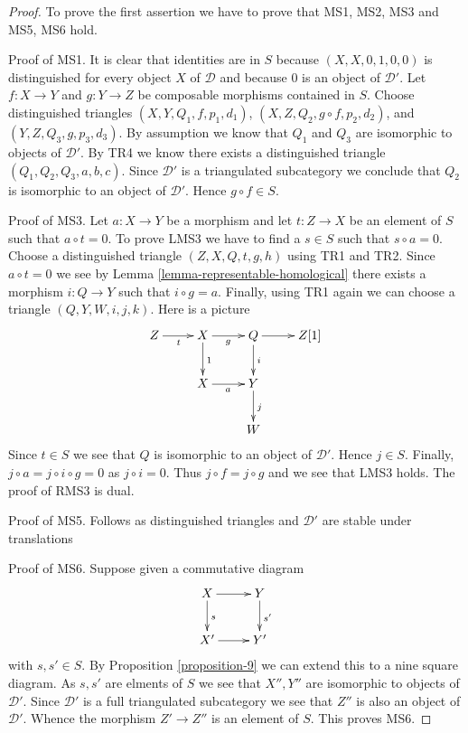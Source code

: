 \begin{proof}
To prove the first assertion we have to prove that
MS1, MS2, MS3 and MS5, MS6 hold.

\medskip\noindent
Proof of MS1. It is clear that identities are in $S$ because
$(X, X, 0, 1, 0, 0)$ is distinguished for every object $X$ of $\mathcal{D}$
and because $0$ is an object of $\mathcal{D}'$. Let $f : X \to Y$
and $g : Y \to Z$ be composable morphisms contained in $S$.
Choose distinguished triangles $(X, Y, Q_1, f, p_1, d_1)$,
$(X, Z, Q_2, g \circ f, p_2, d_2)$, and $(Y, Z, Q_3, g, p_3, d_3)$.
By assumption we know that $Q_1$ and $Q_3$ are isomorphic to objects
of $\mathcal{D}'$. By TR4 we know there exists a distinguished
triangle $(Q_1, Q_2, Q_3, a, b, c)$. Since $\mathcal{D}'$ is a
triangulated subcategory we conclude that $Q_2$ is isomorphic to
an object of $\mathcal{D}'$. Hence $g \circ f \in S$.

\medskip\noindent
Proof of MS3. Let $a : X \to Y$ be a morphism and let $t : Z \to X$ be
an element of $S$ such that $a \circ t = 0$. To prove LMS3 we have to
find a $s \in S$ such that $s \circ a = 0$. Choose a distinguished
triangle $(Z, X, Q, t, g, h)$ using TR1 and TR2. Since $a \circ t = 0$
we see by
Lemma \ref{lemma-representable-homological}
there exists a morphism $i : Q \to Y$ such that $i \circ g = a$.
Finally, using TR1 again we can choose a triangle
$(Q, Y, W, i, j, k)$. Here is a picture
$$
\xymatrix{
Z \ar[r]_t & X \ar[r]_g \ar[d]^1 & Q \ar[r] \ar[d]^i & Z[1] \\
& X \ar[r]_a & Y \ar[d]^j \\
& & W
}
$$
Since $t \in S$ we see that $Q$ is isomorphic to an object of $\mathcal{D}'$.
Hence $j \in S$. Finally, $j \circ a = j \circ i \circ g = 0$ as
$j \circ i = 0$. Thus $j \circ f = j \circ g$ and we see that LMS3 holds.
The proof of RMS3 is dual.

\medskip\noindent
Proof of MS5. Follows as distinguished triangles and $\mathcal{D}'$
are stable under translations

\medskip\noindent
Proof of MS6. Suppose given a commutative diagram
$$
\xymatrix{
X \ar[r] \ar[d]^s &
Y \ar[d]^{s'} \\
X' \ar[r] &
Y'
}
$$
with $s, s' \in S$. By
Proposition \ref{proposition-9}
we can extend this to a nine square diagram. As $s, s'$ are elments of $S$
we see that $X'', Y''$ are isomorphic to objects of $\mathcal{D}'$.
Since $\mathcal{D}'$ is a full triangulated subcategory we see that
$Z''$ is also an object of $\mathcal{D}'$. Whence the morphism $Z' \to Z''$
is an element of $S$. This proves MS6.


\end{proof}
